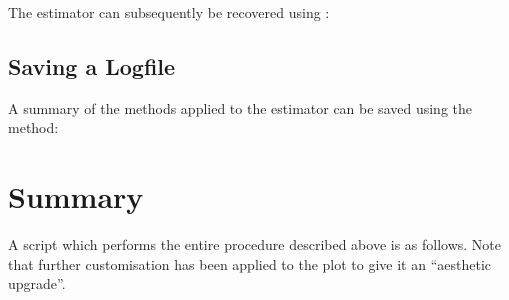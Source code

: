 \documentclass[letterpaper,10pt,english]{sphinxmanual}
\begin{document}
\sphinxAtStartPar
The estimator can subsequently be recovered using
{\hyperref[\detokenize{references/core:nmrespy.core.Estimator.from_pickle}]{}}:

\begin{sphinxVerbatim}[commandchars=\\\{\}]
  
\end{sphinxVerbatim}


\subsection{Saving a Logfile}
\label{\detokenize{walkthrough:saving-a-logfile}}
\sphinxAtStartPar
A summary of the methods applied to the estimator can be saved using the
{\hyperref[\detokenize{references/core:nmrespy.core.Estimator.save_logfile}]{}} method:

\begin{sphinxVerbatim}[commandchars=\\\{\}]
\end{sphinxVerbatim}


\section{Summary}
\label{\detokenize{walkthrough:summary}}
\sphinxAtStartPar
A script which performs the entire procedure described above is as follows.
Note that further customisation has been applied to the plot to give it an
“aesthetic upgrade”.
\end{document}
